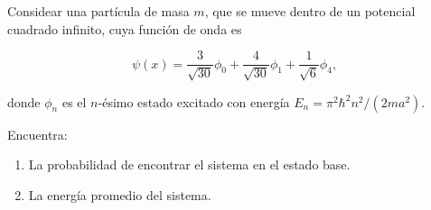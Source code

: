\documentclass[../main.tex]{subfiles}
\begin{document}
\begin{problema}
	Considear una partícula de masa \(m\), que se mueve dentro de un potencial
	cuadrado infinito, cuya función de onda es

	\begin{equation*}
		\psi(x) = \dfrac{3}{\sqrt{30}}\phi_{0} + \dfrac{4}{\sqrt{30}}\phi_{1} +
		\dfrac{1}{\sqrt{6}}\phi_{4},
	\end{equation*}

	donde \(\phi_{n}\) es el \( n\)-ésimo estado excitado con energía
	\(E_{n} = \pi^{2}\hbar^{2}n^{2}/(2ma^{2})\).

	Encuentra:

	\begin{enumerate}
		\item La probabilidad de encontrar el sistema en el estado base.
		\item La energía promedio del sistema.
	\end{enumerate}
\end{problema}
\end{document}
